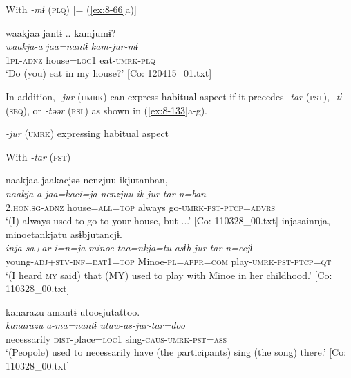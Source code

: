 \ex With \textit{-mɨ} (\textsc{plq}) [= (\ref{ex:8-66}a)]

  {\TM}
\glll  waakjaa  jantɨ ..  kamjumɨ?\\
\textit{waakja-a}  \textit{jaa=nantɨ}  \textit{kam-jur-mɨ}\\
    1\textsc{pl}-\textsc{adnz}  house=\textsc{loc1}  eat-\textsc{umrk}-\textsc{plq}\\
\glt ‘Do (you) eat in my house?’ [Co: 120415\_01.txt]
\z
\z

  In addition, \textit{-jur} (\textsc{umrk}) can express habitual aspect if it precedes \textit{-tar} (\textsc{pst}), \textit{-tɨ} (\textsc{seq}), or \textit{-təər} (\textsc{rsl}) as shown in (\ref{ex:8-133}a-g).

\ea\label{ex:8-133}
  \textit{-jur} (\textsc{umrk}) expressing habitual aspect

  With \textit{-tar} (\textsc{pst})

\ea
{\TM}
\glll  naakjaa  jaakacjəə  {\textbar}nenzjuu{\textbar}  ikjutanban,\\
\textit{naakja-a}  \textit{jaa=kaci=ja}  \textit{nenzjuu}  \textit{ik-jur-tar-n=ban}\\
2.\textsc{hon}.\textsc{sg}-\textsc{adnz}  house=\textsc{all}=\textsc{top}  always  go-\textsc{umrk}-\textsc{pst}-\textsc{ptcp}=\textsc{advrs}\\
\glt ‘(I) always used to go to your house, but ...’ [Co: 110328\_00.txt]
\ex
{\TM}
\glll  injasainnja,  minoetankjatu      asɨbjutancjɨ.\\
\textit{inja-sa+ar-i=n=ja}  \textit{minoe-taa=nkja=tu}      \textit{asɨb-jur-tar-n=ccjɨ}\\
young-\textsc{adj}+\textsc{stv}-\textsc{inf}=\textsc{dat1}=\textsc{top}  Minoe-\textsc{pl}=\textsc{appr}=\textsc{com} play-\textsc{umrk}-\textsc{pst}-\textsc{ptcp}=\textsc{qt}\\
\glt ‘(I heard \textsc{my} said) that (MY) used to play with Minoe in her childhood.’ [Co: 110328\_00.txt]

\ex
{\TM}
\glll  {\textbar}kanarazu{\textbar}  amantɨ  utoosjutattoo.\\
\textit{kanarazu}  \textit{a-ma=nantɨ}  \textit{utaw-as-jur-tar=doo}\\
necessarily  \textsc{dist}-place=\textsc{loc1}  sing-\textsc{caus}-\textsc{umrk}-\textsc{pst}=\textsc{ass}\\
\glt ‘(Peopole) used to necessarily have (the participants) sing (the song) there.’ [Co: 110328\_00.txt]

